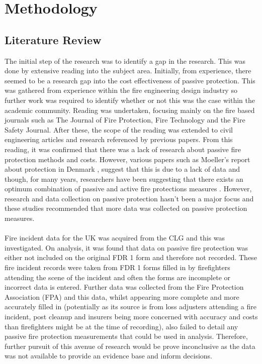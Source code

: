 \documentclass[table,a4paper,oneside]{book}
\begin{document}
\onehalfspacing

\chapter{Methodology}
\label{chapter:Methodology}
\acresetall

\section{Literature Review}
\label{sec:Literature Review}
The initial step of the research was to identify a gap in the research. This was done by extensive reading into the subject area. Initially, from experience, there seemed to be a research gap into the cost effectiveness of passive protection. This was gathered from experience within the fire engineering design industry so further work was required to identify whether or not this was the case within the academic community. Reading was undertaken, focusing mainly on the fire based journals such as The Journal of Fire Protection, Fire Technology and the Fire Safety Journal. After these, the scope of the reading was extended to civil engineering articles and research referenced by previous papers. From this reading, it was confirmed that there was a lack of research about passive fire protection methods and costs. However, various papers such as Moeller's report about protection in Denmark \citep{KristianMoeller2001}, suggest that this is due to a lack of data and though, for many years, researchers have been suggesting that there exists an optimum combination of passive and active fire protections measures \citep{Baldwin1974, Corporation1991, Haack2004}. However, research and data collection on passive protection hasn't been a major focus and these studies recommended that more data was collected on passive protection measures.
\\
\\
Fire incident data for the UK was acquired from the \ac{CLG} and this was investigated. On analysis, it was found that data on passive fire protection was either not included on the original FDR 1 form and therefore not recorded. These fire incident records were taken from FDR 1 forms filled in by firefighters attending the scene of the incident and often the forms are incomplete or incorrect data is entered. Further data was collected from the Fire Protection Association (FPA) and this data, whilst appearing more complete and more accurately filled in (potentially as its source is from loss adjusters attending a fire incident, post cleanup and insurers being more concerned with accuracy and costs than firefighters might be at the time of recording), also failed to detail any passive fire protection measurements that could be used in analysis. Therefore, further pursuit of this avenue of research would be prove inconclusive as the data was not available to provide an evidence base and inform decisions.
\end{document}
